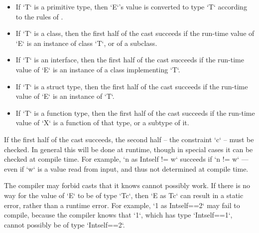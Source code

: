 \begin{itemize}
\item If \xcd`T` is a primitive type, then \xcd`E`'s value is converted to type
      \xcd`T` according to the rules of
      . 
      
\item If \xcd`T` is a class, then the first half of the cast succeeds if the
      run-time value of \xcd`E` is an instance of class \xcd`T`, or of a
      subclass. 

\item If \xcd`T` is an interface, then the first half of the cast succeeds if
      the run-time value of \xcd`E` is an instance of a class implementing
      \xcd`T`. 

\item If \xcd`T` is a struct type, then the first half of the cast succeeds if
      the run-time value of \xcd`E` is an instance of \xcd`T`.  

\item If \xcd`T` is a function type, then the first half of the cast succeeds
      if the run-time value of \xcd`X` is a function of that type, or a
      subtype of it.
\end{itemize}

If the first half of the cast succeeds, the second half -- the constraint
\xcd`{c}` -- must be checked.  In general this will be done at runtime, though
in special cases it can be checked at compile time.   For example, 
\xcd`n as Int{self != w}` succeeds if \xcd`n != w` --- even if \xcd`w` is a value
read from input, and thus not determined at compile time.

The compiler may forbid casts that it knows cannot possibly work. If there is
no way for the value of \xcd`E` to be of type \xcd`T{c}`, then 
\xcd`E as T{c}` can result in a static error, rather than a runtime error.  
For example, \xcd`1 as Int{self==2}` may fail to compile, because the compiler
knows that \xcd`1`, which has type \xcd`Int{self==1}`, cannot possibly be of
type \xcd`Int{self==2}`. 





